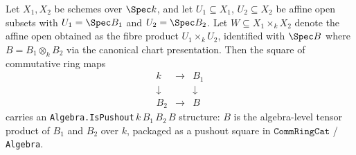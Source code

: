 \begin{lemma}
  \label{lem:chart_algebra_isPushout_of_affine_product}
  Let \(X_1, X_2\) be schemes over \(\Spec k\), and let \(U_1 \subseteq X_1\), \(U_2 \subseteq X_2\) be affine open subsets with \(U_1 = \Spec B_1\) and \(U_2 = \Spec B_2\). Let \(W \subseteq X_1 \times_k X_2\) denote the affine open obtained as the fibre product \(U_1 \times_k U_2\), identified with \(\Spec B\) where \(B = B_1 \otimes_k B_2\) via the canonical chart presentation. Then the square of commutative ring maps
  \[
    \begin{array}{ccc}
      k & \longrightarrow & B_1 \\
      \downarrow & & \downarrow \\
      B_2 & \longrightarrow & B
    \end{array}
  \]
  carries an \texttt{Algebra.IsPushout}\,\(k\)\,\(B_1\)\,\(B_2\)\,\(B\) structure: \(B\) is the algebra-level tensor product of \(B_1\) and \(B_2\) over \(k\), packaged as a pushout square in \(\mathtt{CommRingCat}\) / \texttt{Algebra}.
\end{lemma}

